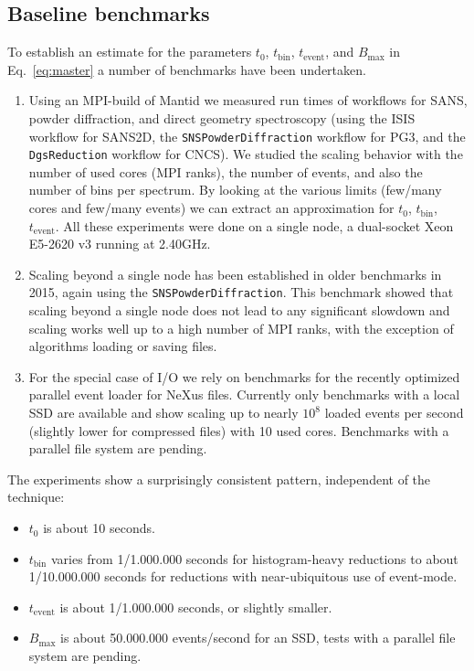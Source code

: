 \documentclass[a4paper,english,numbers=noenddot,bibliography=totoc,chapterprefix=on,DIV=12]{scrartcl}
\newcommand{\Tbin}{t_{\text{bin}}}
\newcommand{\Tevent}{t_{\text{event}}}
\newcommand{\Bmax}{B_{\text{max}}}
\newcommand{\mantid}{Mantid\xspace}
\newcommand{\nexus}{NeXus\xspace}
\begin{document}
\subsection{Baseline benchmarks}
\label{sec:benchmarks}

To establish an estimate for the parameters $t_0$, $\Tbin$, $\Tevent$, and $\Bmax$ in Eq.~\eqref{eq:master} a number of benchmarks have been undertaken.

\begin{enumerate}
  \item Using an MPI-build of \mantid we measured run times of workflows for SANS, powder diffraction, and direct geometry spectroscopy (using the ISIS workflow for SANS2D, the \verb|SNSPowderDiffraction| workflow for PG3, and the \verb|DgsReduction| workflow for CNCS).
    We studied the scaling behavior with the number of used cores (MPI ranks), the number of events, and also the number of bins per spectrum.
    By looking at the various limits (few/many cores and few/many events) we can extract an approximation for $t_0$, $\Tbin$, $\Tevent$.
    All these experiments were done on a single node, a dual-socket Xeon E5-2620 v3 running at 2.40GHz.
  \item Scaling beyond a single node has been established in older benchmarks in 2015, again using the \verb|SNSPowderDiffraction|.
    This benchmark showed that scaling beyond a single node does not lead to any significant slowdown and scaling works well up to a high number of MPI ranks, with the exception of algorithms loading or saving files.
  \item For the special case of I/O we rely on benchmarks for the recently optimized parallel event loader for \nexus files.
    Currently only benchmarks with a local SSD are available and show scaling up to nearly $10^8$ loaded events per second (slightly lower for compressed files) with 10 used cores.
    Benchmarks with a parallel file system are pending.
\end{enumerate}
The experiments show a surprisingly consistent pattern, independent of the technique:

\begin{itemize}
\item $t_0$ is about 10 seconds.
\item $\Tbin$ varies from 1/1.000.000 seconds for histogram-heavy reductions to about 1/10.000.000 seconds for reductions with near-ubiquitous use of event-mode.
\item $\Tevent$ is about 1/1.000.000 seconds, or slightly smaller.
\item $\Bmax$ is about 50.000.000 events/second for an SSD, tests with a parallel file system are pending.
\end{itemize}
\end{document}
